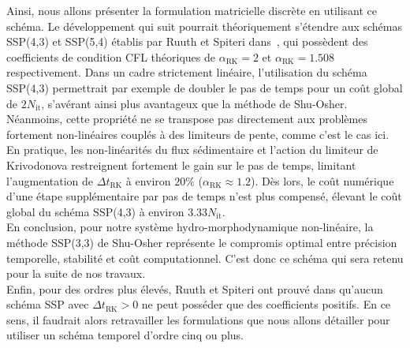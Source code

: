 \documentclass[11pt, a4paper, oneside]{report}
\begin{document}
\enlargethispage{1\baselineskip}
Ainsi, nous allons présenter la formulation matricielle discrète en utilisant ce schéma. Le développement qui suit pourrait théoriquement s'étendre aux schémas SSP(4,3) et SSP(5,4) établis par Ruuth et Spiteri dans~\cite{spiteri2002new}, qui possèdent des coefficients de condition CFL théoriques de $\alpha_\text{RK} = 2$ et $\alpha_\text{RK} = 1.508$ respectivement. Dans un cadre strictement linéaire, l'utilisation du schéma SSP(4,3) permettrait par exemple de doubler le pas de temps pour un coût global de $2N_\text{it}$, s'avérant ainsi plus avantageux que la méthode de Shu-Osher. \\
Néanmoins, cette propriété ne se transpose pas directement aux problèmes fortement non-linéaires couplés à des limiteurs de pente, comme c'est le cas ici. En pratique, les non-linéarités du flux sédimentaire et l'action du limiteur de Krivodonova \cite{krivodonova2007limiters} restreignent fortement le gain sur le pas de temps, limitant l'augmentation de $\Delta t_\text{RK}$ à environ $20\%$ ($\alpha_\text{RK} \approx 1.2$). Dès lors, le coût numérique d'une étape supplémentaire par pas de temps n'est plus compensé, élevant le coût global du schéma SSP(4,3) à environ $3.33 N_\text{it}$. \\
En conclusion, pour notre système hydro-morphodynamique non-linéaire, la méthode SSP(3,3) de Shu-Osher représente le compromis optimal entre précision temporelle, stabilité et coût computationnel. C'est donc ce schéma qui sera retenu pour la suite de nos travaux. \\
Enfin, pour des ordres plus élevés, Ruuth et Spiteri ont prouvé dans \cite{spiteri2002new} qu'aucun schéma SSP avec $\Delta t_\text{RK} > 0$ ne peut posséder que des coefficients positifs. En ce sens, il faudrait alors retravailler les formulations que nous allons détailler pour utiliser un schéma temporel d'ordre cinq ou plus. \\
\end{document}

